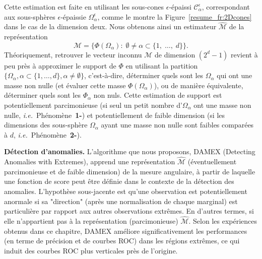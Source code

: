 \documentclass[a4paper, 12pt]{article}
\newcommand{\ie}{\emph{i.e.}{}}
\def\cone{\mathcal{C}}
\begin{document}
Cette estimation est faite en utilisant les sous-cones $\epsilon$-épaissi $\cone_\alpha^\epsilon$, correspondant aux sous-sphères $\epsilon$-épaissie $\Omega_\alpha^\epsilon$, comme le montre la Figure~\ref{resume_fr:2Dcones} dans le cas de la dimension deux.
Nous obtenons ainsi un estimateur $\widehat{\mathcal{M}}$ de la représentation
$$\mathcal{M} = \{ \Phi(\Omega_{\alpha}):\; \emptyset \neq \alpha\subset\{1,\; \ldots,\; d \}\}.$$
Théoriquement, retrouver le vecteur inconnu $\mathcal{M}$ de dimension $(2^{d}-1)$ revient à peu près à approximer le support de $\Phi$ en utilisant la partition
$\{\Omega_\alpha, \alpha\subset\{1,\ldots,d\}, \alpha\neq \emptyset\}$, c'est-à-dire, déterminer quels sont les $\Omega_\alpha$ qui ont
une masse non nulle (et évaluer cette masse $\Phi(\Omega_\alpha)$), ou de manière équivalente, déterminer quels sont les $\Phi_\alpha$ non nuls. Cette estimation de support est potentiellement parcimonieuse (si seul un petit nombre d'$\Omega_\alpha$ ont une masse non nulle, \ie~Phénomène~\textbf{1-}) et
potentiellement de faible dimension (si les dimensions des sous-sphère $\Omega_\alpha$ ayant une masse non nulle sont faibles comparées à $d$, \ie~Phénomène~\textbf{2-}).



\textbf{Détection d'anomalies.}
L'algorithme que nous proposons, DAMEX (Detecting Anomalies with Extremes), apprend une représentation $\widehat{\mathcal{M}}$ (éventuellement parcimonieuse et de faible dimension) de la mesure angulaire, à partir de laquelle une fonction de score peut être définie dans le contexte de la détection des anomalies.
L'hypothèse sous-jacente est qu'une observation est potentiellement anormale si sa "direction" (après une normalisation de chaque marginal) est particulière par rapport aux autres observations extrêmes. En d'autres termes, si elle n'appartient pas à la représentation (parcimonieuse) $\widehat {\mathcal {M}} $. %
Selon les expériences obtenus dans ce chapitre, DAMEX améliore significativement les performances (en terme de précision et de courbes ROC) dans les régions extrêmes, ce qui induit des courbes ROC plus verticales près de l'origine.
\end{document}
